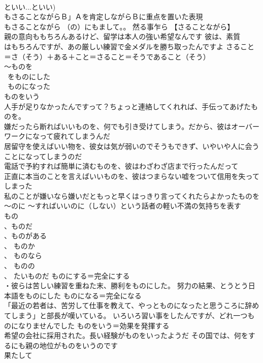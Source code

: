 \documentclass[8pt]{extreport}
\begin{document}
\begin{CJK}{UTF8}{min}
\\	といい...といい) 
\\	もさることながらＢ」Ａを肯定しながらＢに重点を置いた表現 
\\	もさることながら	（の）にもまして。。 然る事乍ら 【さることながら】 
\\	親の意向ももちろんあるけど、留学は本人の強い希望なんです 彼は、素質
\\	はもちろんですが、あの厳しい練習で金メダルを勝ち取ったんですよ さること＝さ（そう）＋ある＋こと＝さること＝そうであること（そう）
\\	～ものを 
\\	~をものにした 
\\	~ものになった 
\\	ものをいう	
\\	人手が足りなかったんですって？ちょっと連絡してくれれば、手伝ってあげたものを。 
\\	嫌だったら断ればいいものを、何でも引き受けてしまう。だから、彼はオーバーワークになって疲れてしまうんだ 
\\	居留守を使えばいい物を、彼女は気が弱いのでそうもできず、いやいや人に会うことになってしまうのだ 
\\	電話で予約すれば簡単に済むものを、彼はわざわざ店まで行ったんだって 
\\	正直に本当のことを言えばいいものを、彼はつまらない嘘をついて信用を失ってしまった 
\\	私のことが嫌いなら嫌いだともっと早くはっきり言ってくれたらよかったものを 
\\	～のに ～すればいいのに（しない）という話者の軽い不満の気持ちを表す 
\\	もの
\\	、ものだ
\\	、ものがある
\\	、 ものか
\\	、 ものなら
\\	、 ものの
\\	、 たいものだ ものにする＝完全にする 
\\	・彼らは苦しい練習を重ねた末、勝利をものにした。 努力の結果、とうとう日本語をものにした ものになる＝完全になる 
\\	「最近の若者は、苦労して仕事を教えて、やっとものになったと思うころに辞めてしまう」と部長が嘆いている。 いろいろ習い事をしたんですが、どれ一つものになりませんでした ものをいう＝効果を発揮する 
\\	希望の会社に採用された。長い経験がものをいったようだ その国では、何をするにも親の地位がものをいうのです
\\	果たして　

\end{CJK}
\end{document}
